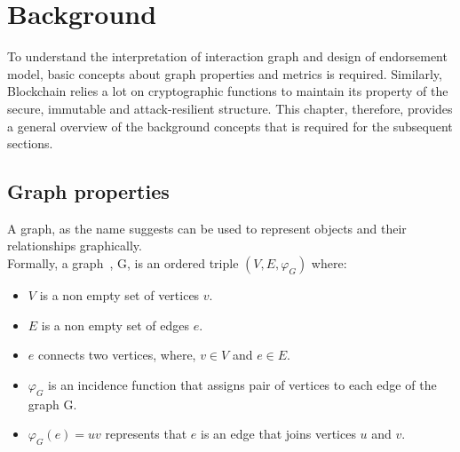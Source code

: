 \chapter{Background} \label{ch:background}
To understand the interpretation of interaction graph and design of endorsement
model, basic concepts about graph properties and metrics is required.
Similarly, Blockchain relies a lot on cryptographic functions to maintain its
property of the secure, immutable and attack-resilient structure. This chapter,
therefore, provides a general overview of the background concepts that is
required for the subsequent sections. 
\section{Graph properties}
A graph, as the name suggests can be used to represent objects and their
relationships graphically. \\
Formally, a graph~\cite{bondy1976graph}, G, is an ordered triple
\displaystyle${(V,E,\varphi _G)}$ where: 
\begin{itemize}
	\item $V$ is a non empty set of vertices $v$.
	\item $E$ is a non empty set of edges $e$.
	\item $e$ connects two vertices, where, $v \in V$ and $e \in E$.  
	\item $\varphi _G$ is an incidence function that assigns pair of vertices
		to each edge of the graph G. 
	\item $\varphi _G(e) = uv$ represents that $e$ is an edge that joins vertices $u$ and $v$.  
\end{itemize}
